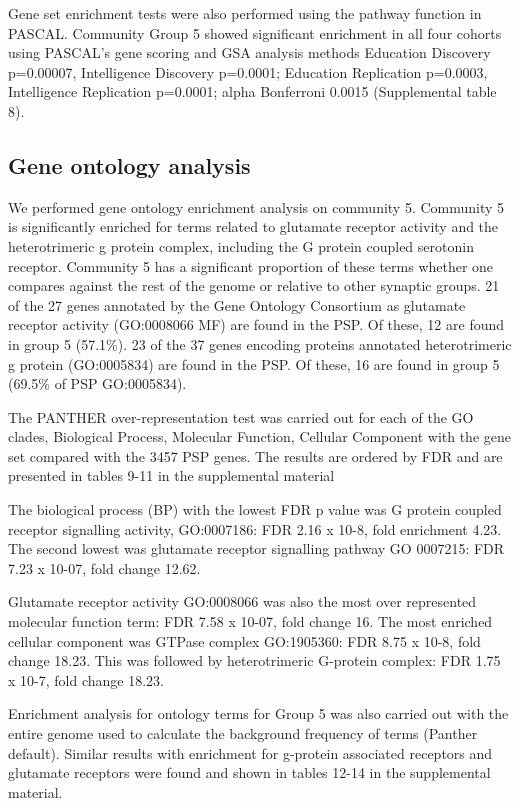 Gene set enrichment tests were also performed using the pathway function in PASCAL.\cite{lamparter2016fast} Community Group 5 showed significant enrichment in all four cohorts using PASCAL’s gene scoring and GSA analysis methods Education Discovery p=0.00007, Intelligence Discovery p=0.0001; Education Replication p=0.0003, Intelligence Replication p=0.0001; alpha Bonferroni 0.0015 (Supplemental table 8). 

\subsection{Gene ontology analysis}
\label{sec: spectral group 5 analysis}
We performed gene ontology enrichment analysis on community  5. Community 5 is significantly enriched for terms related to glutamate receptor activity and the heterotrimeric g protein complex, including the G protein coupled serotonin receptor. Community 5 has a significant proportion of these terms whether one compares against the rest of the genome or relative to other synaptic groups. 21 of the 27 genes annotated by the Gene Ontology Consortium as
glutamate receptor activity (GO:0008066 MF) are found in the PSP. Of these, 12 are found in group 5 (57.1\%). 
23 of the 37 genes encoding proteins annotated heterotrimeric g protein (GO:0005834) are found in the PSP. Of these, 16 are found in group 5 (69.5\% of PSP GO:0005834). 

The PANTHER over-representation test was carried out for each of the GO clades, Biological Process, Molecular Function, Cellular Component with the gene set compared with the 3457 PSP genes. The results are ordered by FDR and are presented in tables 9-11 in the supplemental material 

The biological process (BP) with the lowest FDR p value was G protein coupled receptor signalling activity, GO:0007186: FDR 2.16 x 10-8, fold enrichment 4.23. The second lowest was glutamate receptor signalling pathway GO 0007215: FDR 7.23 x 10-07, fold change 12.62.

Glutamate receptor activity GO:0008066 was also the most over represented molecular function term: FDR 7.58 x 10-07, fold change 16. The most enriched cellular component was GTPase complex GO:1905360: FDR 8.75 x 10-8, fold change 18.23. This was followed by heterotrimeric G-protein complex: FDR 1.75 x 10-7, fold change 18.23.

Enrichment analysis for ontology terms for Group 5 was also carried out with the entire genome  used to calculate the background frequency of terms (Panther default). Similar results with enrichment for g-protein associated receptors and glutamate receptors were found and shown in tables 12-14 in the supplemental material.

